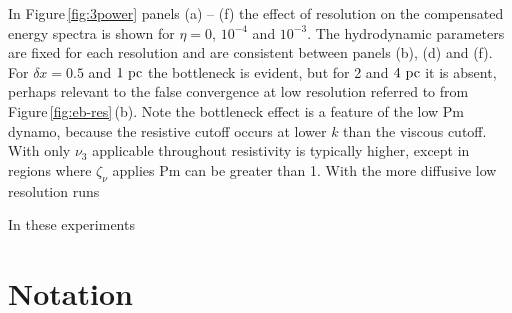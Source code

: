 \documentclass[preprint2]{aastex63}
\newcommand\pc{~ {\rm pc}}
\begin{document}
In Figure\,\ref{fig:3power} panels (a) -- (f) the effect of resolution on the
compensated energy spectra is shown for $\eta=0$, $10^{-4}$ and $10^{-3}$.
The hydrodynamic parameters are fixed for each resolution and are 
consistent between panels (b), (d) and (f).
For $\delta x=0.5$ and $1\pc$ the bottleneck is evident, but for 2 and $4\pc$ it
is absent, perhaps relevant to the false convergence at low resolution 
referred to from Figure\,\ref{fig:eb-res}\,(b).
Note the bottleneck effect is a feature of the low Pm dynamo, because the
resistive cutoff occurs at lower $k$ than the viscous cutoff.
With only $\nu_3$ applicable throughout resistivity is typically higher, 
except in regions where $\zeta_\nu$ applies Pm can be greater than 1.
With the more diffusive low resolution runs

In these experiments

{}


\appendix

\section{Notation}
\end{document}

